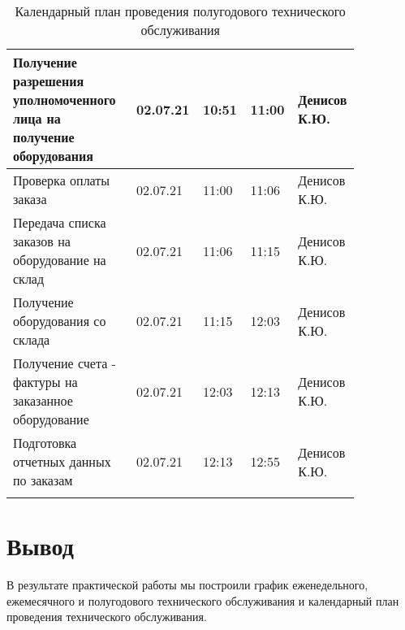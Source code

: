 \documentclass[a4paper,14pt]{extarticle}
\begin{document}
\begin{longtable}{|p{0.35\linewidth}|p{0.1\linewidth}|p{0.1\linewidth}|p{0.13\linewidth}|p{0.17\linewidth}|}
		Получение разрешения уполномоченного 
		лица на получение оборудования  & 02.07.21 & 10:51 & 11:00 & Денисов К.Ю. \\ \hline
		Проверка оплаты заказа  & 02.07.21 & 11:00 & 11:06 & Денисов К.Ю. \\ \hline
		Передача списка заказов на 
		оборудование на склад  & 02.07.21 & 11:06 & 11:15 & Денисов К.Ю. \\ \hline
		Получение оборудования со склада  & 02.07.21 & 11:15 & 12:03 & Денисов К.Ю. \\ \hline
		Получение счета - фактуры на 
		заказанное оборудование  & 02.07.21 & 12:03 & 12:13 & Денисов К.Ю. \\ \hline
		Подготовка отчетных данных по 
		заказам  & 02.07.21 & 12:13 & 12:55 & Денисов К.Ю. \\ \hline
		
		\caption{Календарный план проведения полугодового технического обслуживания}
		\label{tab:calendar-year}
	\end{longtable}

\section*{Вывод}
В результате практической работы мы построили график еженедельного, ежемесячного и полугодового технического обслуживания и календарный план проведения технического обслуживания.





\normalsize
\end{document}
